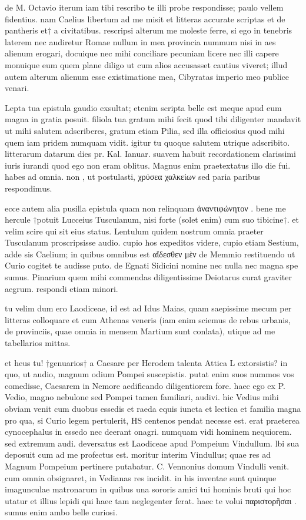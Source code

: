  de M. Octavio iterum iam tibi rescribo te illi probe respondisse; paulo vellem fidentius. nam Caelius libertum ad me misit et litteras accurate scriptas et de pantheris et† a civitatibus. rescripsi alterum me moleste ferre, si ego in tenebris laterem nec audiretur Romae nullum in mea provincia nummum nisi in aes alienum erogari, docuique nec mihi conciliare pecuniam licere nec illi capere monuique eum quem plane diligo ut cum alios accusasset cautius viveret; illud autem alterum alienum esse existimatione mea, Cibyratas imperio meo publice venari.

 Lepta tua epistula gaudio exsultat; etenim scripta belle est meque apud eum magna in gratia posuit. filiola tua gratum mihi fecit quod tibi diligenter mandavit ut mihi salutem adscriberes, gratum etiam Pilia, sed illa officiosius quod mihi quem iam pridem numquam vidit. igitur tu quoque salutem utrique adscribito. litterarum datarum dies pr. Kal. Ianuar. suavem habuit recordationem clarissimi iuris iurandi quod ego non eram oblitus. Magnus enim praetextatus illo die fui. habes ad omnia. non , ut postulasti, χρύσεα χαλκείων sed paria paribus respondimus.

 ecce autem alia pusilla epistula quam non relinquam ἀναντιφώνητον . bene me hercule †potuit Lucceius Tusculanum, nisi forte (solet enim) cum suo tibicine†. et velim scire qui sit eius status. Lentulum quidem nostrum omnia praeter Tusculanum proscripsisse audio. cupio hos expeditos videre, cupio etiam Sestium, adde sis Caelium; in quibus omnibus est αἴδεσθεν μὲν de Memmio restituendo ut Curio cogitet te audisse puto. de Egnati Sidicini nomine nec nulla nec magna spe sumus. Pinarium quem mihi commendas diligentissime Deiotarus curat graviter aegrum. respondi etiam minori.

 tu velim dum ero Laodiceae, id est ad Idus Maias, quam saepissime mecum per litteras colloquare et cum Athenas veneris (iam enim sciemus de rebus urbanis, de provinciis, quae omnia in mensem Martium sunt conlata), utique ad me tabellarios mittas.

 et heus tu! †genuarios† a Caesare per Herodem talenta Attica L extorsistis? in quo, ut audio, magnum odium Pompei suscepistis. putat enim suos nummos vos comedisse, Caesarem in Nemore aedificando diligentiorem fore. haec ego ex P. Vedio, magno nebulone sed Pompei tamen familiari, audivi. hic Vedius mihi obviam venit cum duobus essedis et raeda equis iuncta et lectica et familia magna pro qua, si Curio legem pertulerit, HS centenos pendat necesse est. erat praeterea cynocephalus in essedo nec deerant onagri. numquam vidi hominem nequiorem. sed extremum audi. deversatus est Laodiceae apud Pompeium Vindullum. lbi sua deposuit cum ad me profectus est. moritur interim Vindullus; quae res ad Magnum Pompeium pertinere putabatur. C. Vennonius domum Vindulli venit. cum omnia obsignaret, in Vedianas res incidit. in his inventae sunt quinque imagunculae matronarum in quibus una sororis amici tui hominis bruti qui hoc utatur et illius lepidi qui haec tam neglegenter ferat. haec te volui παριστορῆσαι . sumus enim ambo belle curiosi.

